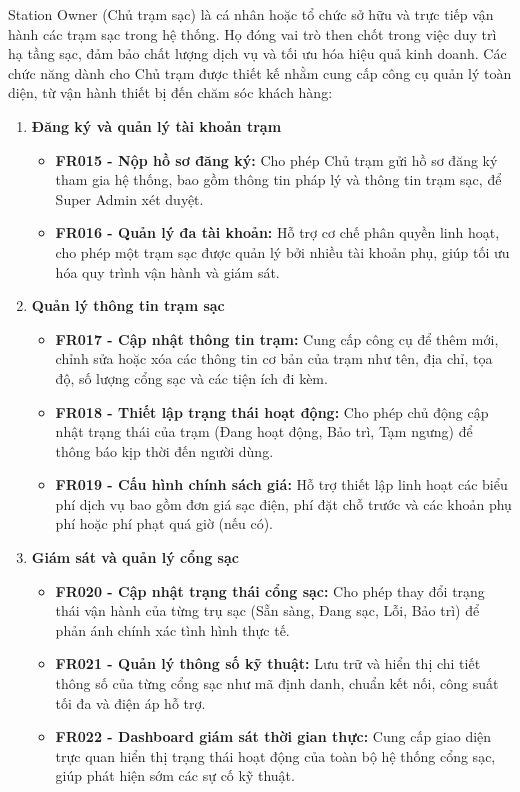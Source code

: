 Station Owner (Chủ trạm sạc) là cá nhân hoặc tổ chức sở hữu và trực tiếp vận hành các trạm sạc trong hệ thống. Họ đóng vai trò then chốt trong việc duy trì hạ tầng sạc, đảm bảo chất lượng dịch vụ và tối ưu hóa hiệu quả kinh doanh. Các chức năng dành cho Chủ trạm được thiết kế nhằm cung cấp công cụ quản lý toàn diện, từ vận hành thiết bị đến chăm sóc khách hàng:
\begin{enumerate}[label=\textbf{\alph*)}]
 \item \textbf{Đăng ký và quản lý tài khoản trạm}
 \begin{itemize}
    \item \textbf{FR015 - Nộp hồ sơ đăng ký:} Cho phép Chủ trạm gửi hồ sơ đăng ký tham gia hệ thống, bao gồm thông tin pháp lý và thông tin trạm sạc, để Super Admin xét duyệt.
    \item \textbf{FR016 - Quản lý đa tài khoản:} Hỗ trợ cơ chế phân quyền linh hoạt, cho phép một trạm sạc được quản lý bởi nhiều tài khoản phụ, giúp tối ưu hóa quy trình vận hành và giám sát.
 \end{itemize}
 \item \textbf{Quản lý thông tin trạm sạc}
 \begin{itemize}
    \item \textbf{FR017 - Cập nhật thông tin trạm:} Cung cấp công cụ để thêm mới, chỉnh sửa hoặc xóa các thông tin cơ bản của trạm như tên, địa chỉ, tọa độ, số lượng cổng sạc và các tiện ích đi kèm.
    \item \textbf{FR018 - Thiết lập trạng thái hoạt động:} Cho phép chủ động cập nhật trạng thái của trạm (Đang hoạt động, Bảo trì, Tạm ngưng) để thông báo kịp thời đến người dùng.
    \item \textbf{FR019 - Cấu hình chính sách giá:} Hỗ trợ thiết lập linh hoạt các biểu phí dịch vụ bao gồm đơn giá sạc điện, phí đặt chỗ trước và các khoản phụ phí hoặc phí phạt quá giờ (nếu có).
 \end{itemize}
 \item \textbf{Giám sát và quản lý cổng sạc}
 \begin{itemize}
    \item \textbf{FR020 - Cập nhật trạng thái cổng sạc:} Cho phép thay đổi trạng thái vận hành của từng trụ sạc (Sẵn sàng, Đang sạc, Lỗi, Bảo trì) để phản ánh chính xác tình hình thực tế.
    \item \textbf{FR021 - Quản lý thông số kỹ thuật:} Lưu trữ và hiển thị chi tiết thông số của từng cổng sạc như mã định danh, chuẩn kết nối, công suất tối đa và điện áp hỗ trợ.
    \item \textbf{FR022 - Dashboard giám sát thời gian thực:} Cung cấp giao diện trực quan hiển thị trạng thái hoạt động của toàn bộ hệ thống cổng sạc, giúp phát hiện sớm các sự cố kỹ thuật.

\end{itemize}
\end{enumerate}
